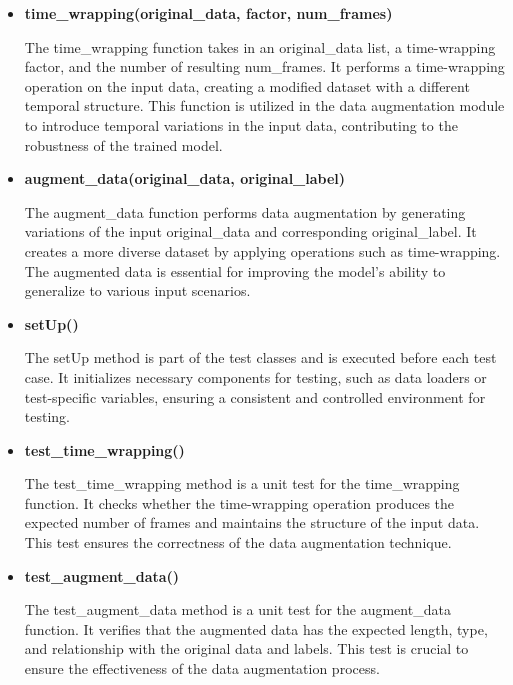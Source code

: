 		\begin{itemize}
			
			\item \textbf{time\_wrapping(original\_data, factor, num\_frames)}
			
			The time\_wrapping function takes in an original\_data list, a time-wrapping factor, and the number of resulting num\_frames. It performs a time-wrapping operation on the input data, creating a modified dataset with a different temporal structure. This function is utilized in the data augmentation module to introduce temporal variations in the input data, contributing to the robustness of the trained model.
			
			\item \textbf{augment\_data(original\_data, original\_label)}
			
			The augment\_data function performs data augmentation by generating variations of the input original\_data and corresponding original\_label. It creates a more diverse dataset by applying operations such as time-wrapping. The augmented data is essential for improving the model's ability to generalize to various input scenarios.
			
			\item \textbf{setUp()}
			
			The setUp method is part of the test classes and is executed before each test case. It initializes necessary components for testing, such as data loaders or test-specific variables, ensuring a consistent and controlled environment for testing.
			
			\item \textbf{test\_time\_wrapping()}
			
			The test\_time\_wrapping method is a unit test for the time\_wrapping function. It checks whether the time-wrapping operation produces the expected number of frames and maintains the structure of the input data. This test ensures the correctness of the data augmentation technique.
			
			\item \textbf{test\_augment\_data()}
			
			The test\_augment\_data method is a unit test for the augment\_data function. It verifies that the augmented data has the expected length, type, and relationship with the original data and labels. This test is crucial to ensure the effectiveness of the data augmentation process.
			
		\end{itemize}
	
